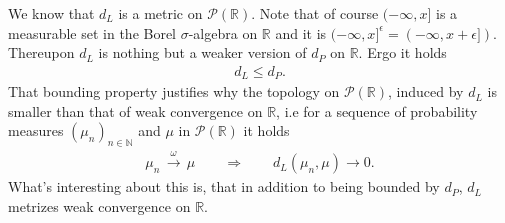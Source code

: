 \documentclass[11pt,a4paper]{article}
\begin{document}
\noindent{}We know that $d_L$ is a metric on $\mathcal{P}(\mathbb{R})$. Note that of course $(-\infty,x]$ is a measurable set in the Borel $\sigma$-algebra on $\mathbb{R}$ and it is $(-\infty,x]^{\epsilon} = (-\infty,x+\epsilon]).$ Thereupon $d_L$ is nothing but a weaker version of $d_P$ on $\mathbb{R}$. Ergo it holds
\begin{align*}
d_L\leq{}d_P.
\end{align*}
That bounding property justifies why the topology on $\mathcal{P}(\mathbb{R})$, induced by $d_L$ is smaller than that of weak convergence on $\mathbb{R}$, i.e for a sequence of probability measures $(\mu_n)_{n\in\mathbb{N}}$ and $\mu$ in $\mathcal{P}(\mathbb{R})$ it holds
\begin{align*}
\mu_n \,\xrightarrow{\omega}\, \mu \qquad \Longrightarrow \qquad d_L(\mu_n,\mu)\longrightarrow{}0.
\end{align*}
What's interesting about this is, that in addition to being bounded by $d_P$, $d_L$ metrizes weak convergence on $\mathbb{R}$.\vspace{1em}\\
\end{document}

